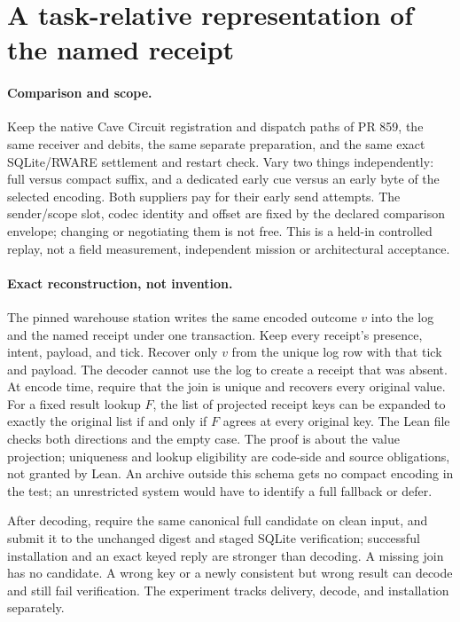 \documentclass{article}
\begin{document}
\section*{A task-relative representation of the named receipt}
\paragraph{Comparison and scope.}
Keep the native Cave Circuit registration and dispatch paths of PR 859,
the same receiver and debits, the same separate preparation, and the
same exact SQLite/RWARE settlement and restart check. Vary two things
independently: full versus compact suffix, and a dedicated early cue
versus an early byte of the selected encoding. Both suppliers pay for
their early send attempts. The sender/scope slot, codec identity and
offset are fixed by the declared comparison envelope; changing or
negotiating them is not free. This is a held-in controlled replay, not a
field measurement, independent mission or architectural acceptance.

\paragraph{Exact reconstruction, not invention.}
The pinned warehouse station writes the same encoded outcome $v$ into
the log and the named receipt under one transaction. Keep every
receipt's presence, intent, payload, and tick. Recover only $v$ from
the unique log row with that tick and payload. The decoder cannot use
the log to create a receipt that was absent. At encode time, require
that the join is unique and recovers every original value. For a fixed
result lookup $F$, the list of projected receipt keys can be expanded
to exactly the original list if and only if $F$ agrees at every
original key. The Lean file checks both directions and the empty case.
The proof is about the value projection; uniqueness and lookup
eligibility are code-side and source obligations, not granted by Lean.
An archive outside this schema gets no compact encoding in the test;
an unrestricted system would have to identify a full fallback or defer.

After decoding, require the same canonical full candidate on clean input,
and submit it to the unchanged digest and staged SQLite verification;
successful installation and an exact keyed reply are stronger than
decoding. A missing join has no candidate. A wrong key or a newly
consistent but wrong result can decode and still fail verification.
The experiment tracks delivery, decode, and installation separately.
\end{document}
